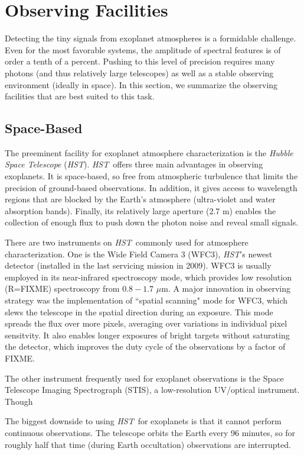 \documentclass[graybox,natbib,nosecnum]{svmult}
\newcommand{\project}[1]{\textsl{#1}}
\newcommand{\HST}{\project{HST}}
\begin{document}
\section{Observing Facilities}
Detecting the tiny signals from exoplanet atmospheres is a formidable challenge. Even for the most favorable systems, the amplitude of spectral features is of order a tenth of a percent. Pushing to this level of precision requires many photons (and thus relatively large telescopes) as well as a stable observing environment (ideally in space).  In this section, we summarize the observing facilities that are best suited to this task.

\subsection{Space-Based}
The preeminent facility for exoplanet atmosphere characterization is the \emph{Hubble Space Telescope} (\HST).
\HST\ offers three main advantages in observing exoplanets. It is space-based, so free from atmospheric turbulence that limits the precision of ground-based observations. In addition, it gives access to wavelength regions that are blocked by the Earth's atmosphere (ultra-violet and water absorption bands).  Finally, its relatively large aperture (2.7 m) enables the collection of enough flux to push down the photon noise and reveal small signals.

There are two instruments on \HST\ commonly used for atmosphere characterization. One is the Wide Field Camera 3 (WFC3), \HST's newest detector (installed in the last servicing mission in 2009). WFC3 is usually employed in its near-infrared spectroscopy mode, which provides low resolution (R=FIXME) spectroscopy from $0.8 - 1.7$ $\mu$m. A major innovation in observing strategy was the implementation of ``spatial scanning" mode for WFC3, which slews the telescope in the spatial direction during an exposure. This mode spreads the flux over more pixels, averaging over variations in individual pixel sensitvity. It also enables longer exposures of bright targets without saturating the detector, which improves the duty cycle of the observations by a factor of FIXME.

The other instrument frequently used for exoplanet observations is the Space Telescope Imaging Spectrograph (STIS), a low-resolution UV/optical instrument. Though  

The biggest downside to using \HST\ for exoplanets is that it cannot perform continuous observations. The telescope orbits the Earth every 96 minutes, so for roughly half that time (during Earth occultation) observations are interrupted. 
\end{document}
